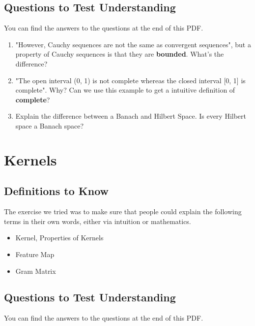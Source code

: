\documentclass[12pt]{article}
\begin{document}
\subsection{Questions to Test Understanding}
\label{sec:ques-measure}

You can find the answers to the questions at the end of this PDF.

\begin{enumerate}
    \item "However, Cauchy sequences are not the same as convergent sequences", but a property of Cauchy sequences is that they are \textbf{bounded}. What's the difference?

    \item "The open interval (0, 1) is not complete whereas the closed interval [0, 1] is complete". Why? Can we use this example to get a intuitive definition of \textbf{complete}?

    \item Explain the difference between a Banach and Hilbert Space. Is every Hilbert space a Banach space?
\end{enumerate}

\section{Kernels}

\subsection{Definitions to Know}

The exercise we tried was to make sure that people could explain the following terms in their own words, either via intuition or mathematics.

\begin{itemize}
    \item Kernel, Properties of Kernels
    \item Feature Map
    \item Gram Matrix
\end{itemize}

\subsection{Questions to Test Understanding}
\label{sec:ques-kernel}

You can find the answers to the questions at the end of this PDF.
\end{document}
